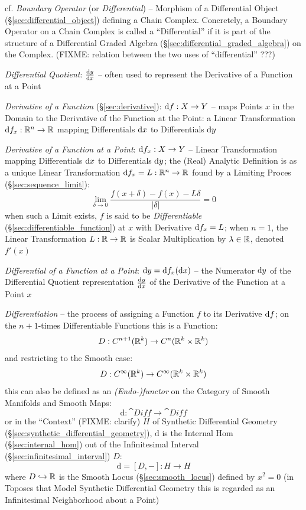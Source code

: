 {\fist cf. \emph{Boundary Operator} (or \emph{Differential}) -- Morphism of a
Differential Object (\S\ref{sec:differential_object}) defining a Chain Complex.
Concretely, a Boundary Operator on a Chain Complex is called a ``Differential''
if it is part of the structure of a Differential Graded Algebra
(\S\ref{sec:differential_graded_algebra}) on the Complex.
(FIXME: relation between the two uses of ``differential'' ???)

\emph{Differential Quotient}: $\frac{\mathrm{d}y}{\mathrm{d}x}$ -- often used to represent the
Derivative of a Function at a Point

\emph{Derivative of a Function} (\S\ref{sec:derivative}): $\mathrm{d}f : X
\rightarrow Y$ -- maps Points $x$ in the Domain to the Derivative of the
Function at the Point: a Linear Transformation
$\mathrm{d}f_x : \mathbb{R}^n \rightarrow \mathbb{R}$ mapping Differentials $\mathrm{d}x$ to
Differentials $\mathrm{d}y$

\emph{Derivative of a Function at a Point}: $\mathrm{d}f_x : X \rightarrow Y$ --
Linear Transformation mapping Differentials $\mathrm{d}x$ to Differentials
$\mathrm{d}y$; the (Real) Analytic Definition is as a unique Linear Transformation
$\mathrm{d}f_x = L : \mathbb{R}^n \rightarrow \mathbb{R}$ found by a Limiting Proces
(\S\ref{sec:sequence_limit}):
\[
  \lim_{\delta\rightarrow0} \frac{f(x + \delta) - f(x) - L\delta}{|\delta|} = 0
\]
when such a Limit exists, $f$ is said to be \emph{Differentiable}
(\S\ref{sec:differentiable_function}) at $x$ with Derivative $\mathrm{d}f_x = L$;
when $n=1$, the Linear Transformation $L : \mathbb{R} \rightarrow \mathbb{R}$ is Scalar
Multiplication by $\lambda \in \mathbb{R}$, denoted $f'(x)$

\emph{Differential of a Function at a Point}:
$\mathrm{d}y = \mathrm{d}f_x(\mathrm{d}x)$ -- the Numerator $\mathrm{d}y$ of the
Differential Quotient representation $\frac{\mathrm{d}y}{\mathrm{d}x}$ of the Derivative of the
Function at a Point $x$

\emph{Differentiation} -- the process of assigning a Function $f$ to its
Derivative $\mathrm{d}f$; on the $n+1$-times Differentiable Functions this is a
Function:
\[
  D : C^{n+1}(\mathbb{R}^k) \rightarrow C^n(\mathbb{R}^k \times \mathbb{R}^k)
\]
and restricting to the Smooth case:
\[
  D : C^\infty(\mathbb{R}^k) \rightarrow C^\infty(\mathbb{R}^k \times \mathbb{R}^k)
\]
this can also be defined as an \emph{(Endo-)functor} on the Category of Smooth
Manifolds and Smooth Maps:
\[
  \mathrm{d} : \cat{Diff} \rightarrow \cat{Diff}
\]
or in the ``Context'' (FIXME: clarify) $H$ of Synthetic Differential Geometry
(\S\ref{sec:synthetic_differential_geometry}), $\mathrm{d}$ is the Internal Hom
(\S\ref{sec:internal_hom}) out of the Infinitesimal Interval
(\S\ref{sec:infinitesimal_interval}) $D$:
\[
  \mathrm{d} = [D,-] : H \rightarrow H
\]
where $D \hookrightarrow \mathbb{R}$ is the Smooth Locus (\S\ref{sec:smooth_locus})
defined by $x^2 = 0$ (in Toposes that Model Synthetic Differential Geometry this
is regarded as an Infinitesimal Neighborhood about a Point)

}
